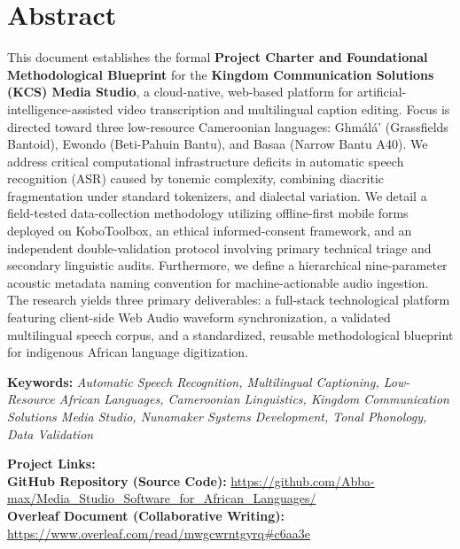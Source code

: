 \documentclass[a4paper,11pt]{article}
\author{IUSJ Engineering Group}
\begin{document}
\mytitle

\newpage

\section*{Abstract}
This document establishes the formal \textbf{Project Charter and Foundational Methodological Blueprint} for the \textbf{Kingdom Communication Solutions (KCS) Media Studio}, a cloud-native, web-based platform for artificial-intelligence-assisted video transcription and multilingual caption editing. Focus is directed toward three low-resource Cameroonian languages: Gh\textopeno m\'al\'a' (Grassfields Bantoid), Ewondo (Beti-Pahuin Bantu), and Basaa (Narrow Bantu A40). We address critical computational infrastructure deficits in automatic speech recognition (ASR) caused by tonemic complexity, combining diacritic fragmentation under standard tokenizers, and dialectal variation. We detail a field-tested data-collection methodology utilizing offline-first mobile forms deployed on KoboToolbox, an ethical informed-consent framework, and an independent double-validation protocol involving primary technical triage and secondary linguistic audits. Furthermore, we define a hierarchical nine-parameter acoustic metadata naming convention for machine-actionable audio ingestion. The research yields three primary deliverables: a full-stack technological platform featuring client-side Web Audio waveform synchronization, a validated multilingual speech corpus, and a standardized, reusable methodological blueprint for indigenous African language digitization.

\vspace{1em}
\noindent\textbf{Keywords:} \textit{Automatic Speech Recognition, Multilingual Captioning, Low-Resource African Languages, Cameroonian Linguistics, Kingdom Communication Solutions Media Studio, Nunamaker Systems Development, Tonal Phonology, Data Validation}

\newpage

\frontmatter
\tableofcontents

\vspace{2em}
\noindent \textbf{Project Links:}\\
\textbf{GitHub Repository (Source Code):} \url{https://github.com/Abba-max/Media_Studio_Software_for_African_Languages/}\\
\textbf{Overleaf Document (Collaborative Writing):} \url{https://www.overleaf.com/read/mwgcwrntgyrq#c6aa3e}
\end{document}
